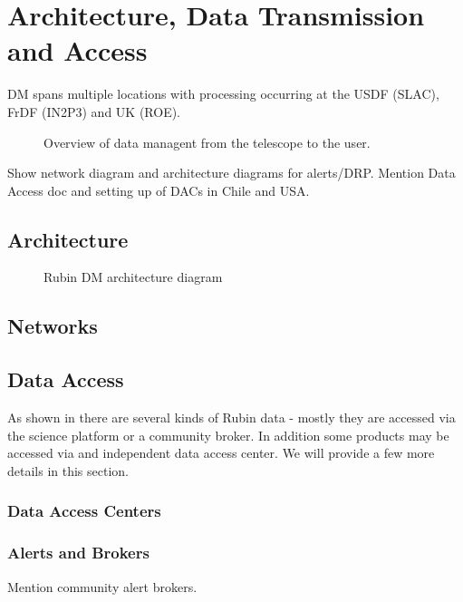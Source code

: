 \section {Architecture, Data Transmission and  Access } \label{sec:arch}
DM spans multiple locations with processing occurring at the USDF (SLAC), FrDF (IN2P3) and UK (ROE).
\begin{figure}
\caption{Overview of data managent from the telescope to the user. \label{fig:vision}}
\end{figure}

Show network diagram and architecture diagrams for alerts/DRP. Mention Data Access doc  \citep{RDO-013} and
setting up of DACs in Chile and USA.

\subsection{Architecture}

\begin{figure}
\caption{Rubin DM architecture diagram \citet{LDM-148}\label{fig:arch}}
\end{figure}

\subsection{Networks} \label{sec:network}

\subsection{Data Access} \label{sec:dataaccess}

As shown in  there are several kinds of Rubin data - mostly they are accessed via
the science platform or a community broker.
In addition some products may be accessed via and independent data access center. We will provide a few more details in this section.

\subsubsection{Data Access Centers}

\subsubsection{Alerts and Brokers}
Mention community alert brokers.
